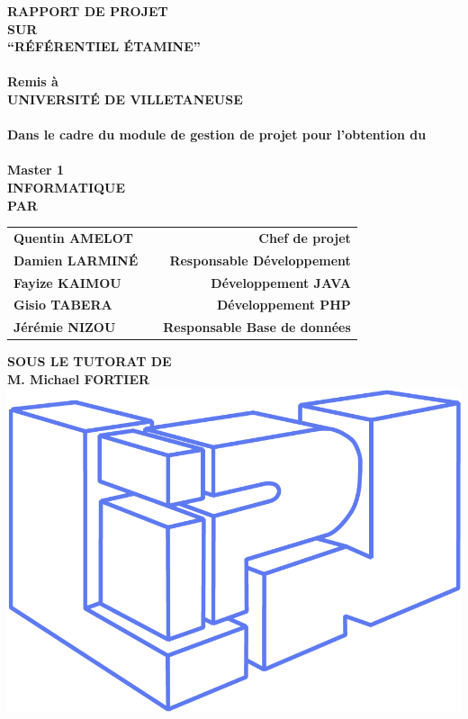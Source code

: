 \newpage
\begin{center}
\thispagestyle{empty}
\Large{\textbf{RAPPORT DE PROJET\\SUR}}\\[0.3cm]
\Large{\textsc {\textbf{``RÉFÉRENTIEL ÉTAMINE''}}}\\
\Large{\textbf{\\Remis à}}
\LARGE{\textbf{\\UNIVERSITÉ DE VILLETANEUSE\\}}
\large{\textbf{\\Dans le cadre du module de gestion de projet pour l'obtention du\\}}
\LARGE{\textbf{\\Master 1\\INFORMATIQUE}}
\vspace{0.3cm}
\Large{\textbf{\\PAR}}\\[0.3cm]
\begin{table}[h]
\centering
\Large{
\begin{tabular}{>{\bfseries}lc>{\bfseries}r}
Quentin AMELOT & & Chef de projet\\Damien LARMINÉ & & Responsable Développement\\Fayize KAIMOU & & Développement JAVA\\Gisio TABERA & & Développement PHP\\Jérémie NIZOU & & Responsable Base de données\\
\end{tabular}}
\end{table}
\large{\textbf{SOUS LE TUTORAT DE}}\\
\large{\textbf{M. Michael FORTIER}}\\[0.5cm]
\includegraphics[scale=0.25]{project/images/logo-lipn}\\

\end{center}
